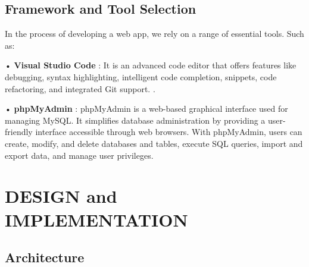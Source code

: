 \documentclass{nascproject}
\begin{document}
\section{Framework and Tool Selection}
In the process of developing a web app, we rely on a range of essential tools.
Such as:

• \textbf{Visual Studio Code} : It is an advanced code editor that offers features like debugging, syntax highlighting, intelligent code completion, snippets, code refactoring, and integrated Git support.
.

• \textbf{phpMyAdmin} : phpMyAdmin is a web-based graphical interface used for managing MySQL. It simplifies database administration by providing a user-friendly interface accessible through web browsers. With phpMyAdmin, users can create, modify, and delete databases and tables, execute SQL queries, import and export data, and manage user privileges.


\chapter{DESIGN and IMPLEMENTATION}
\section{Architecture}
\end{document}
